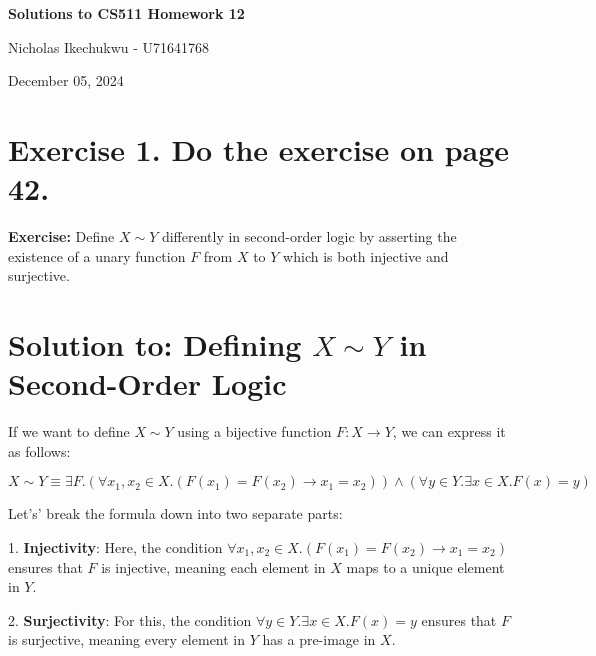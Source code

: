 \documentclass{article}
\begin{document}
\begin{center}
    \Large\textbf{Solutions to CS511 Homework 12}
    
    \vspace{0.5cm}
    
    \large Nicholas Ikechukwu - U71641768
    
    \vspace{0.3cm}
    
    \large December 05, 2024
\end{center}



\section*{Exercise 1. Do the exercise on page 42.}

\begin{mdframed}
    \vspace{1em}
        \textbf{Exercise:} Define \( X \sim Y \) differently in second-order logic by asserting the existence of a unary function \( F \) from \( X \) to \( Y \) which is both injective and surjective.
    \vspace{1em}
\end{mdframed}


\section*{Solution to: Defining $X \sim Y$ in Second-Order Logic}

If we want to define $X \sim Y$ using a bijective function $F: X \to Y$, we can express it as follows:

\[
X \sim Y \equiv \exists F. (\forall x_1, x_2 \in X. (F(x_1) = F(x_2) \rightarrow x_1 = x_2)) \land (\forall y \in Y. \exists x \in X. F(x) = y)
\]

\vspace{1em}
Let's' break the formula down into two separate parts:

\vspace{1em}
1. \textbf{Injectivity}: Here, the condition $\forall x_1, x_2 \in X. (F(x_1) = F(x_2) \rightarrow x_1 = x_2)$ ensures that $F$ is injective, meaning each element in $X$ maps to a unique element in $Y$.

\vspace{1em}
2. \textbf{Surjectivity}: For this, the condition $\forall y \in Y. \exists x \in X. F(x) = y$ ensures that $F$ is surjective, meaning every element in $Y$ has a pre-image in $X$.
\end{document}
